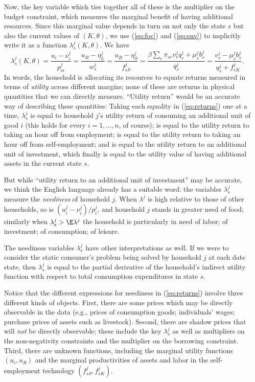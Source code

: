 \documentclass[11pt]{article}
\newcommand{\Eq}[1]{(\ref{eq:#1})}
\begin{document}
Now, the key variable which ties together all of these is the
multiplier on the budget constraint, which measures the marginal
benefit of having additional resources.  Since this marginal value
depends in turn on not only the state $s$ but also the current values
of $(K,\theta)$, we use \Eq{foc} and \Eq{env} to implicitly write it as a
function $\lambda^j_s(K,\theta)$.  We have
\begin{equation}
\label{eq:returns}
   \lambda^j_s(K,\theta) = \frac{u_i - \nu^j_i}{p^j_{si}} = \frac{u_R - \eta^j_L}{w^j_s} =
   \frac{u_R-\eta^j_S}{f^j_{sS}}=\frac{\beta\sum_r\pi_{sr}v^j_{r}q^j_{r} +
     \mu^j_sb^j_s}{q^j_s} = \frac{v^j_{s}-\mu^j_sb^j_s}{q^j_s + f^j_{sK}}.
\end{equation}
In words, the household is allocating its resources to equate returns
measured in terms of \emph{utility} across different margins; none of
these are returns in physical quantities that we can directly measure.
``Utility return'' would be an accurate way of describing these
quantities: Taking each equality in \Eq{returns} one at a
time, $\lambda^j_s$ is equal to household \(j\)'s utility return of
consuming an additional unit of good $i$ (this holds for every
$i=1,\dots,n$, of course); is equal to the utility return to taking an
hour off from employment; is equal to the utility return to taking an
hour off from self-employment; and is equal to the utility return to
an additional unit of investment, which finally is equal to the
utility value of having additional assets in the current state $s$.

But while ``utility return to an additional unit of investment'' may
be accurate, we think the English language already has a suitable
word: the variables $\lambda^j_s$ measure the \emph{neediness} of
household \(j\).  When $\lambda^j$ is high relative to those of other
households, so is $(u^j_i-\nu^j_i)/p^j_i$, and household \(j\) stands in greater
need of food; similarly when $\lambda^j_s>\E\lambda^j$ the household
is particularly in need of labor; of investment; of consumption; of
leisure. 

The neediness variables $\lambda^j_s$ have other interpretations as
well.  If we were to consider the static consumer's problem being
solved by household $j$ at each  date state, then $\lambda^j_s$ is
equal to the partial derivative of the household's indirect utility
function with respect to total consumption expenditures in state $s$.

Notice that the different expressions for neediness in \Eq{returns}
involve three different kinds of objects.  First, there are some
prices which may be directly observable in the data (e.g., prices of
consumption goods; individuals' wages; purchase prices of assets such
as livestock).  Second, there are shadow prices that will \emph{not}
be directly observable; these include the key $\lambda^j_s$ as well as
multipliers on the non-negativity constraints and the multiplier on
the borrowing constraint.  Third, there are unknown functions,
including the marginal utility functions $(u_i,u_R)$ and the marginal
productivities of assets and labor in the self-employment technology
$(f^j_{sS},f^j_{sK})$.
\end{document}
